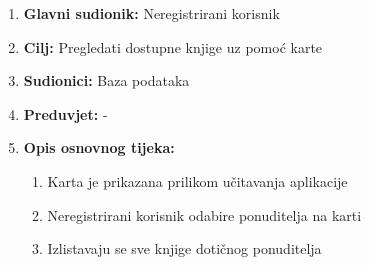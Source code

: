 \documentclass[12pt]{report}
\begin{document}
\noindent {}
\begin{enumerate}
	
	\item \textbf{Glavni sudionik: }Neregistrirani korisnik
	\item  \textbf{Cilj:} Pregledati dostupne knjige uz pomoć karte
	\item  \textbf{Sudionici:} Baza podataka
	\item  \textbf{Preduvjet:} - 
	\item  \textbf{Opis osnovnog tijeka:}
	
	\begin{enumerate}
		
		\item Karta je prikazana prilikom učitavanja aplikacije
		\item Neregistrirani korisnik odabire ponuditelja na karti
		\item Izlistavaju se sve knjige dotičnog ponuditelja
		
	\end{enumerate}

\end{enumerate}
\end{document}
